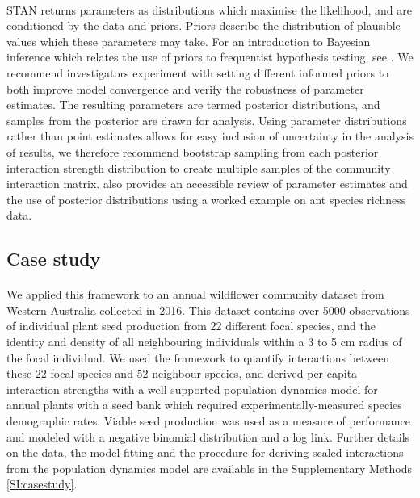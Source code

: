 \documentclass[a4,12pt]{article}
\begin{document}
        \paragraph{}
        STAN returns parameters as distributions which maximise the likelihood, and are conditioned by the data and priors. Priors describe the distribution of plausible values which these parameters may take. For an introduction to Bayesian inference which relates the use of priors to frequentist hypothesis testing, see \textcite{Ellison1996}. We recommend investigators experiment with setting different informed priors to both improve model convergence and verify the robustness of parameter estimates. The resulting parameters are termed posterior distributions, and samples from the posterior are drawn for analysis. Using parameter distributions rather than point estimates allows for easy inclusion of uncertainty in the analysis of results, we therefore recommend bootstrap sampling from each posterior interaction strength distribution to create multiple samples of the community interaction matrix. \textcite{Ellison2004} also provides an accessible review of parameter estimates and the use of posterior distributions using a worked example on ant species richness data.


    \subsection{Case study}

       \paragraph{}
        We applied this framework to an annual wildflower community dataset from Western Australia collected in 2016. This dataset contains over 5000 observations of individual plant seed production from 22 different focal species, and the identity and density of all neighbouring individuals within a 3 to 5 cm radius of the focal individual. We used the framework to quantify interactions between these 22 focal species and 52 neighbour species, and derived per-capita interaction strengths with a well-supported population dynamics model for annual plants with a seed bank \parencite{Levine2009, Bimler2018} which required experimentally-measured species demographic rates. Viable seed production was used as a measure of performance and modeled with a negative binomial distribution and a log link.
        Further details on the data, the model fitting and the procedure for deriving scaled interactions from the population dynamics model are available in the Supplementary Methods \ref{SI:casestudy}.
\end{document}
